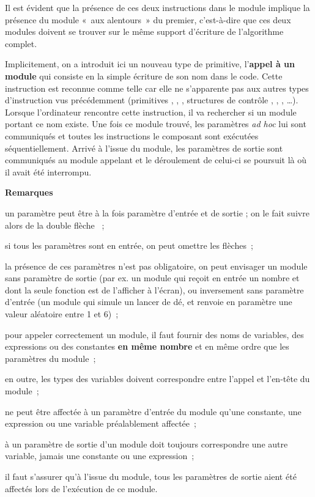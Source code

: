 	Il est évident que la présence 
	de ces deux instructions dans le module 
	implique la présence du module 
	«~aux alentours~» du premier, 
	c’est-à-dire que ces deux modules doivent
	se trouver sur le même support d’écriture de
	l’algorithme complet.

	Implicitement, 
	on a introduit ici un nouveau type de primitive, 
	l’\textbf{appel à un module}
	qui consiste en la simple écriture de son
	nom dans le code. 
	Cette instruction est reconnue comme telle 
	car elle ne s’apparente pas aux autres types d’instruction 
	vus précédemment 
	(primitives , ,
	\pseudocode{\Gets}, 
	structures de contrôle
	, ,
	, \dots).
	Lorsque l’ordinateur rencontre cette instruction, 
	il va rechercher si un module portant ce nom existe. 
	Une fois ce module trouvé, les paramètres \textit{ad hoc} 
	lui sont communiqués et toutes les instructions le composant 
	sont exécutées séquentiellement. 
	Arrivé à l’issue du module, 
	les paramètres de sortie sont communiqués au module appelant 
	et le déroulement de celui-ci se poursuit là où il avait été
	interrompu.

	{\bfseries Remarques}

	\begin{liste}
	\item
		un paramètre peut être à la fois paramètre d’entrée et de sortie ; 
		on le fait suivre alors de la double flèche \pseudocode{\InOut}~;
	\item
		si tous les paramètres sont en entrée, 
		on peut omettre les flèches~;
	\item
		la présence de ces paramètres n’est pas obligatoire, 
		on peut envisager un module sans paramètre de sortie 
		(par ex. un module qui reçoit en entrée un nombre 
		et dont la seule fonction est de l’afficher à l’écran), 
		ou inversement sans paramètre d’entrée 
		(un module qui simule un lancer de dé, 
		et renvoie en paramètre une valeur aléatoire entre 1 et 6)~;
	\item
		pour appeler correctement un module, 
		il faut fournir des noms de variables, 
		des expressions ou des constantes \textbf{en même nombre} 
		et en même ordre que les paramètres du module~;
	\item
		en outre, les types des variables doivent correspondre 
		entre l’appel et l’en-tête du module~;
	\item
		ne peut être affectée à un paramètre d’entrée du module 
		qu’une constante, une expression 
		ou une variable préalablement affectée~;
	\item 
		à un paramètre de sortie d’un module 
		doit toujours correspondre une autre variable, 
		jamais une constante ou une expression~;
	\item
		il faut s’assurer qu’à l’issue du module, 
		tous les paramètres de sortie aient été affectés 
		lors de l’exécution de ce module.
	\end{liste}

